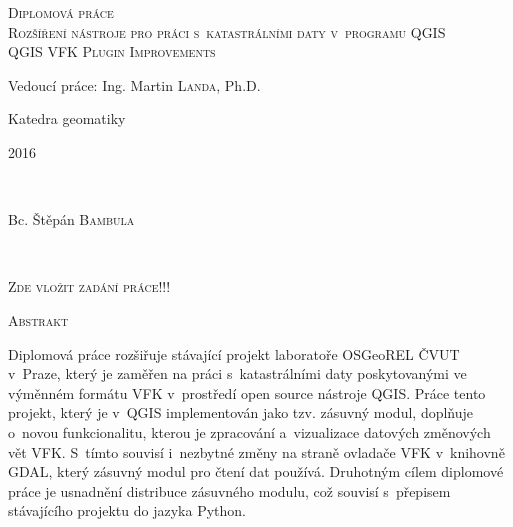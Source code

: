 \documentclass[a4paper,12pt,oneside]{book}
\begin{document}
\begin{titlepage}
\textsc{\Large Diplomová práce}\\
\vfill
\textsc{\LARGE  Rozšíření nástroje pro práci s~katastrálními daty v~programu QGIS}\\[0.5cm] %

\textsc{\Large QGIS VFK Plugin Improvements}
 
 
 \vfill
\large Vedoucí práce: Ing. Martin \textsc{Landa}, Ph.D.

Katedra geomatiky
 
\vfill
\begin{minipage}{0.4\textwidth}
\begin{flushleft} 
\large 2016	%
\end{flushleft}
\end{minipage}
~
\begin{minipage}{0.4\textwidth}
\begin{flushright} 
\large Bc. Štěpán \textsc{Bambula} \\ %
\end{flushright}
\end{minipage}\\[1cm]
 
\end{titlepage}

\clearpage
\pagestyle{empty}

\vspace*{\fill}
\begin{center}
\textsc{\Large Zde vložit zadání práce!!!}
\end{center}

\vspace*{\fill}

\clearpage

\hfill

\noindent
\textsc{\Large Abstrakt}

\vspace{12pt}

Diplomová práce rozšiřuje stávající projekt laboratoře OSGeoREL ČVUT
v~Pra\-ze, který je zaměřen na práci s~katastrálními daty
poskytovanými ve výměnném formátu VFK v~prostředí open source nástroje
QGIS. Práce tento projekt, který je v~QGIS implementován jako
tzv. zásuvný modul, doplňuje o~novou funkcionalitu, kterou je
zpracování a~vizualizace datových změnových vět VFK. S~tímto souvisí
i~nezbytné změny na straně ovladače VFK v~knihovně GDAL, který zásuvný
modul pro čtení dat používá. Druhotným cílem diplomové práce je
usnadnění distribuce zásuvného modulu, což souvisí s~přepisem
stávajícího projektu do jazyka Python.
\end{document}
